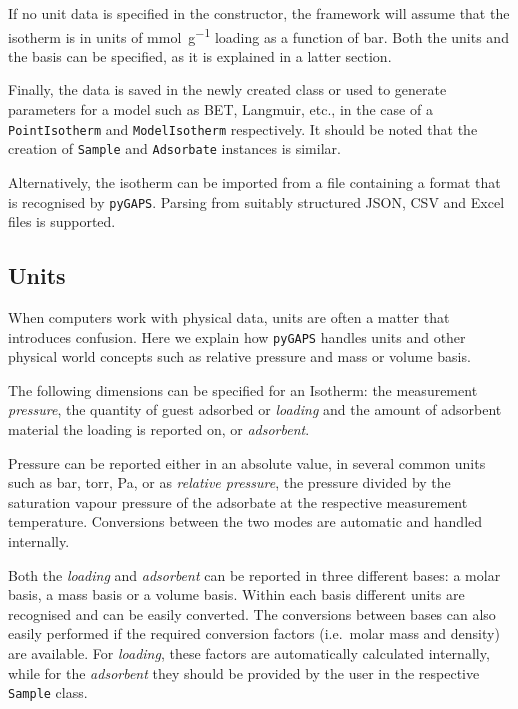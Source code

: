 If no unit data is specified in the constructor, the framework will
assume that the isotherm is in units of \si{\milli\mole\per\gram} 
loading as a function of \si{\bar}. Both the units and the basis 
can be specified, as it is explained in a latter section.

Finally, the data is saved in the newly created class or used to
generate parameters for a model such as BET, Langmuir, etc.,
in the case of a \texttt{PointIsotherm} and
\texttt{ModelIsotherm} respectively. It should be noted that the creation of
\texttt{Sample} and \texttt{Adsorbate} instances is similar.

Alternatively, the isotherm can be imported from a file containing 
a format that is recognised by \texttt{pyGAPS}. Parsing from 
suitably structured JSON, CSV and Excel files is supported.

\subsection{Units}

When computers work with physical data, units are often a matter 
that introduces confusion. Here we explain how \texttt{pyGAPS} 
handles units and other physical world concepts such as relative
pressure and mass or volume basis.

The following dimensions can be specified for an Isotherm: 
the measurement \textit{pressure}, the quantity of guest adsorbed
or \textit{loading} and the amount of adsorbent material
the loading is reported on, or \textit{adsorbent}.

Pressure can be reported either in an absolute value, in several 
common units such as \si{\bar}, torr, \si{\pascal}, or as 
\textit{relative pressure}, the pressure divided by the saturation 
vapour pressure of the adsorbate at the respective measurement
temperature. Conversions between the two modes are automatic 
and handled internally.

Both the \textit{loading} and \textit{adsorbent} can be reported
in three different bases: a molar basis, a mass basis or a volume
basis. Within each basis different units are recognised and can be
easily converted. The conversions between bases can also
easily performed if the required conversion factors (i.e.\ molar 
mass and density) are available. For \textit{loading}, these 
factors are automatically calculated internally, while
for the \textit{adsorbent} they should be provided by the user 
in the respective \texttt{Sample} class.

